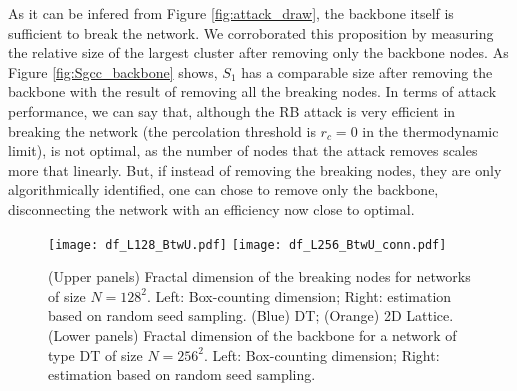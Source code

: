\documentclass{article}
\begin{document}
As it can be infered from Figure \ref{fig:attack_draw}, the backbone itself is sufficient to break the network. We corroborated this proposition by measuring the relative size of the largest cluster after removing only the backbone nodes. As Figure \ref{fig:Sgcc_backbone} shows, $S_1$ has a comparable size after removing the backbone with the result of removing all the breaking nodes. 
In terms of attack performance, we can say that, although the RB attack is very efficient in breaking the network (the percolation threshold is $r_c = 0$ in the thermodynamic limit), is not optimal, as the number of nodes that the attack removes scales more that linearly. But, if instead of removing the breaking nodes, they are only algorithmically identified, one can chose to remove only the backbone, disconnecting the network with an efficiency now close to optimal.

\begin{figure}
\centering
\texttt{[image: df\_L128\_BtwU.pdf]}
\texttt{[image: df\_L256\_BtwU\_conn.pdf]}
\caption{\label{fig:fractal_dimension} (Upper panels) Fractal dimension of the breaking nodes for networks of size $N=128^2$. Left: Box-counting dimension; Right: estimation based on random seed sampling. (Blue) DT; (Orange) 2D Lattice. (Lower panels) Fractal dimension of the backbone for a network of type DT of size $N=256^2$. Left: Box-counting dimension; Right: estimation based on random seed sampling.}
\end{figure}




\end{document}
